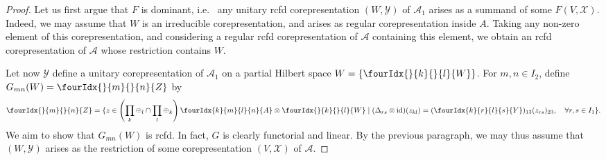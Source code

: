 \documentclass[11pt]{article}
\DeclareMathOperator{\id}{id}
\newcommand{\Gr}[5]{\fourIdx{#2}{#4}{#3}{#5}{#1}}%
\newcommand{\Gru}[3]{\Gr{#1}{}{}{#2}{#3}}
\theoremstyle{definition}
\numberwithin{equation}{section}
\begin{document}
\begin{proof}
Let us first argue that $F$ is dominant, i.e.~ any unitary rcfd corepresentation $(W,\mathscr{Y})$ of $\mathscr{A}_1$ arises as a summand of some $F(V,\mathscr{X})$. Indeed, we may assume that $W$ is an irreducible corepresentation, and arises as regular corepresentation inside $A$. Taking any non-zero element of this corepresentation, and considering a regular rcfd corepresentation of $\mathscr{A}$ containing this element, we obtain an rcfd corepresentation of $\mathscr{A}$ whose restriction contains $W$.

Let now $\mathscr{Y}$ define a unitary corepresentation of $\mathscr{A}_1$ on a partial Hilbert space $W= \{\Gru{W}{k}{l}\}$. For $m,n\in I_{2}$, define $G_{mn}(W) = \Gru{Z}{m}{n}$ by \[ \Gru{Z}{m}{n} = \{z \in \left(\prod_k\oplus_l\cap \prod_l\oplus_k\right) \Gr{A}{k}{l}{m}{n}\otimes \Gru{W}{k}{l}\mid (\Delta_{rs}\otimes \id)(z_{kl}) = (\Gr{Y}{k}{l}{r}{s})_{13}(z_{rs})_{23},\quad \forall r,s\in I_1\}.\] We aim to show that $G_{mn}(W)$ is rcfd. In fact, $G$ is clearly functorial and linear. By the previous paragraph, we may thus assume that $(W,\mathscr{Y})$ arises as the restriction of some corepresentation $(V,\mathscr{X})$ of $\mathscr{A}$. 


\end{proof}
\end{document}
